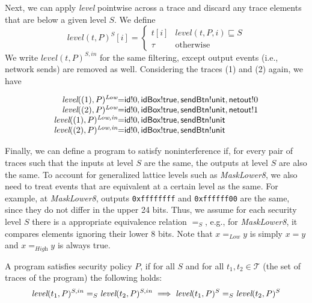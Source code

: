 \documentclass{llncs}
\newcommand{\code}[1]{\textsf{#1}} %
\newcommand{\bcode}[1]{\texttt{#1}}
\newcommand{\tr}{t\xspace}
\newcommand{\tset}{\ensuremath{\mathcal{T}}\xspace}
\newcommand{\tlevel}[3]{\textit{level}(#1, #2, #3)}
\newcommand{\tleveltr}[2]{\textit{level}(#1, #2)}
\begin{document}
Next, we can apply \textit{level} pointwise across a trace and discard
any trace elements that are below a given level $S$. We define
\begin{displaymath}
  \tleveltr{\tr}{P}^S[i] =
  \begin{cases}
    \tr[i] & \tlevel{\tr}{P}{i} \sqsubseteq S \\
    \tau & \textrm{otherwise}
  \end{cases}
\end{displaymath}
We write $\tleveltr{\tr}{P}^{S,in}$ for the same filtering, except
output events (i.e., network sends) are removed as well.
%
Considering the traces (1) and (2) again, we have

\begin{displaymath}
  \begin{array}{r@{ }c@{ }l}
    \tleveltr{(1)}{P}^\textit{Low} & = & \code{id}!0, \code{idBox}!\code{true},
    \code{sendBtn}!\code{unit}, \code{netout}!0 \\
    \tleveltr{(2)}{P}^\textit{Low} & = & \code{id}!0, \code{idBox}!\code{true},
    \code{sendBtn}!\code{unit}, \code{netout}!1 \\
    \tleveltr{(1)}{P}^\textit{Low,in} & = & \code{id}!0, \code{idBox}!\code{true},
    \code{sendBtn}!\code{unit} \\
    \tleveltr{(2)}{P}^\textit{Low,in} & = & \code{id}!0, \code{idBox}!\code{true},
    \code{sendBtn}!\code{unit} \\
  \end{array}
\end{displaymath}

Finally, we can define a program to satisfy noninterference if, for
every pair of traces such that the inputs at level $S$ are the same,
the outputs at level $S$ are also the same.
%
To account for generalized lattice levels such as \textit{MaskLower8},
we also need to treat events that are equivalent at a certain level as
the same. For example, at \textit{MaskLower8}, outputs
\bcode{0xffffffff} and \bcode{0xffffff00} are the same, since they do
not differ in the upper 24 bits. Thus, we assume for each security
level $S$ there is a appropriate equivalence relation $=_S$, e.g., for
\textit{MaskLower8}, it compares elements ignoring their lower 8
bits. Note that $x =_\textit{Low} y$ is simply $x = y$ and
$x =_\textit{High} y$ is always true.

\begin{definition}
  \label{defn:noninterference}
  A program satisfies security policy $P$, if for all $S$ and for
  all $t_1, t_2 \in
  \tset$ (the set of traces of the program) the following holds:
  \begin{displaymath}
    \tleveltr{\tr_1}{P}^{S,in} =_S \tleveltr{\tr_2}{P}^{S,in}
    \implies
    \tleveltr{\tr_1}{P}^S =_S \tleveltr{\tr_2}{P}^S \\
  \end{displaymath}
\end{definition}
\end{document}
